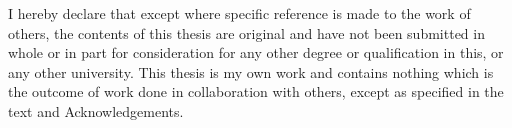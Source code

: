 
\begin{declaration}

I hereby declare that except where specific reference is made to the work of
others, the contents of this thesis are original and have not been
submitted in whole or in part for consideration for any other degree or
qualification in this, or any other university. This thesis is my own
work and contains nothing which is the outcome of work done in collaboration
with others, except as specified in the text and Acknowledgements.


\end{declaration}

